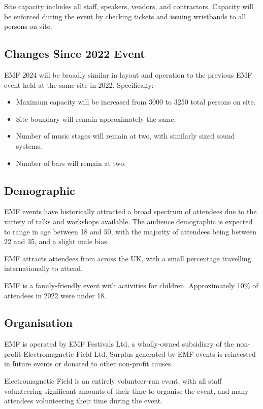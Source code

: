 Site capacity includes all staff, speakers, vendors, and contractors. Capacity will be enforced during the
event by checking tickets and issuing wristbands to all persons on site.

\subsection{Changes Since 2022 Event}

EMF 2024 will be broadly similar in layout and operation to the previous EMF event held at
the same site in 2022. Specifically:

\begin{itemize}
    \tightlist
    \item Maximum capacity will be increased from 3000 to 3250 total persons on site.
    \item Site boundary will remain approximately the same.
    \item Number of music stages will remain at two, with similarly sized sound systems.
    \item Number of bars will remain at two.
\end{itemize}

\subsection{Demographic}
EMF events have historically attracted a broad spectrum of attendees due to the
variety of talks and workshops available. The audience demographic is expected
to range in age between 18 and 50, with the majority of attendees being between
22 and 35, and a slight male bias.

EMF attracts attendees from across the UK, with a small percentage travelling
internationally to attend.

EMF is a family-friendly event with activities for children. Approximately 10\%
of attendees in 2022 were under 18.

\subsection{Organisation}
EMF is operated by EMF Festivals Ltd, a wholly-owned subsidiary of the non-profit
Electromagnetic Field Ltd. Surplus generated by EMF events is reinvested in future
events or donated to other non-profit causes.

Electromagnetic Field is an entirely volunteer-run event, with all staff
volunteering significant amounts of their time to organise the event, and many
attendees volunteering their time during the event.

